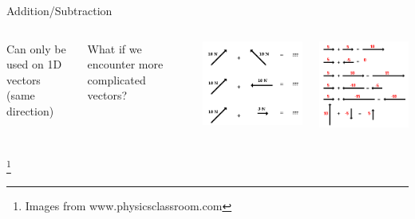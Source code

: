 \documentclass[aspectratio=43]{beamer}
\newcommand\blfootnote[1]{%
	\begingroup
	\renewcommand\thefootnote{}\footnote{#1}%
	\addtocounter{footnote}{-1}%
	\endgroup
}
\begin{document}
\begin{frame}{Addition/Subtraction}
	\begin{columns}
		Can only be used on 1D vectors \\ (same direction)\\~\\
		\uncover<2-> {What if we encounter more complicated vectors?\\
		\begin{center}
			\includegraphics[scale=0.4]{compvec.png}
		\end{center}}
		\includegraphics[scale=0.5]{vectoradd.png}
	\end{columns}
	\blfootnote{Images from www.physicsclassroom.com}
\end{frame}
\end{document}
